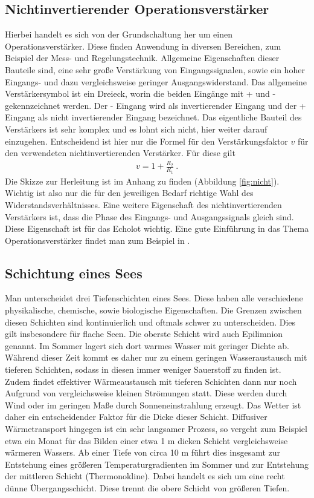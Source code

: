 \documentclass[12pt,a4paper,titlepage,headinclude,bibtotoc]{scrartcl}
\numberwithin{equation}{subsection}
\begin{document}
\subsection{Nichtinvertierender Operationsverstärker}
\label{sec:teoverstaerker}
Hierbei handelt es sich von der Grundschaltung her um einen Operationsverstärker.
Diese finden Anwendung in diversen Bereichen, zum Beispiel der Mess- und Regelungstechnik. 
Allgemeine Eigenschaften dieser Bauteile sind, eine sehr große Verstärkung von Eingangssignalen, sowie ein hoher Eingangs- und dazu vergleichsweise geringer Ausgangswiderstand.
Das allgemeine Verstärkersymbol ist ein Dreieck, worin die beiden Eingänge mit + und - gekennzeichnet werden.
Der - Eingang wird als invertierender Eingang und der + Eingang als nicht invertierender Eingang bezeichnet.
Das eigentliche Bauteil des Verstärkers ist sehr komplex und es lohnt sich nicht, hier weiter darauf einzugehen.
Entscheidend ist hier nur die Formel für den Verstärkungsfaktor $v$ für den verwendeten nichtinvertierenden Verstärker. 
Für diese gilt
\begin{align}
 v = 1 + \frac{R_2}{R_1}~.\label{eq:verst}
\end{align}
Die Skizze zur Herleitung ist im Anhang zu finden (Abbildung \ref{fig:nicht}).
Wichtig ist also nur die für den jeweiligen Bedarf richtige Wahl des Widerstandsverhältnisses.
Eine weitere Eigenschaft des nichtinvertierenden Verstärkers ist, dass die Phase des Eingangs- und Ausgangssignals gleich sind.
Diese Eigenschaft ist für das Echolot wichtig. Eine gute Einführung in das Thema Operationsverstärker findet man zum Beispiel in \cite{op}.


\subsection{Schichtung eines Sees}
\label{sec:Schichtung}
Man unterscheidet drei Tiefenschichten eines Sees.
Diese haben alle verschiedene physikalische, chemische, sowie biologische Eigenschaften.
Die Grenzen zwischen diesen Schichten sind kontinuierlich und oftmals schwer zu unterscheiden. 
Dies gilt insbesondere für flache Seen.
Die oberste Schicht wird auch Epilimnion genannt. 
Im Sommer lagert sich dort warmes Wasser mit geringer Dichte ab.
Während dieser Zeit kommt es daher nur zu einem geringen Wasseraustausch mit tieferen Schichten, sodass in diesen immer weniger Sauerstoff zu finden ist.
Zudem findet effektiver Wärmeaustausch mit tieferen Schichten dann nur noch Aufgrund von vergleichsweise kleinen Strömungen statt.
Diese werden durch Wind oder im geringen Maße durch Sonneneinstrahlung erzeugt. 
Das Wetter ist daher ein entscheidender Faktor für die Dicke dieser Schicht.
Diffusiver Wärmetransport hingegen ist ein sehr langsamer Prozess, so vergeht zum Beispiel etwa ein Monat für das Bilden einer etwa 1 m dicken Schicht vergleichsweise wärmeren Wassers.
Ab einer Tiefe von circa 10 m führt dies insgesamt zur Entstehung eines größeren Temperaturgradienten im Sommer und zur Entstehung der mittleren Schicht (Thermonokline).
Dabei handelt es sich um eine recht dünne Übergangsschicht.
Diese trennt die obere Schicht von größeren Tiefen. 
\newline
\end{document}
